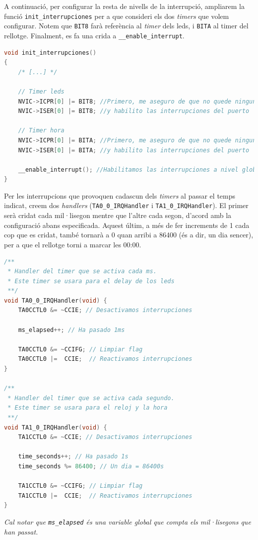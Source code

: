 \documentclass{../pdae} %
\begin{document}
A continuació, per configurar la resta de nivells de la interrupció, ampliarem
la funció \texttt{init\_interrupciones} per a que consideri els dos
\textit{timers} que volem configurar.
Notem que \texttt{BIT8} farà referència al \textit{timer} dels leds, i
\texttt{BITA} al timer del rellotge. Finalment, es fa una crida a
\texttt{\_\_enable\_interrupt}.

\begin{lstlisting}[language=C]
void init_interrupciones()
{
 	/* [...] */

    // Timer leds
    NVIC->ICPR[0] |= BIT8; //Primero, me aseguro de que no quede ninguna interrupcion residual pendiente para este puerto,
    NVIC->ISER[0] |= BIT8; //y habilito las interrupciones del puerto

    // Timer hora
    NVIC->ICPR[0] |= BITA; //Primero, me aseguro de que no quede ninguna interrupcion residual pendiente para este puerto,
    NVIC->ISER[0] |= BITA; //y habilito las interrupciones del puerto

    __enable_interrupt(); //Habilitamos las interrupciones a nivel global del micro.
}
\end{lstlisting}

Per les interrupcions que provoquen cadascun dels \textit{timers} al passar
el temps indicat, creem dos \textit{handlers} (\texttt{TA0\_0\_IRQHandler} i
\texttt{TA1\_0\_IRQHandler}). El primer serà cridat cada mil·lisegon mentre que
l'altre cada segon, d'acord amb la configuració abans especificada. Aquest
últim, a més de fer increments de 1 cada cop que es cridat, també tornarà a
0 quan arribi a 86400 (és a dir, un dia sencer), per a que el rellotge torni
a marcar les 00:00.

\begin{lstlisting}[language=C]
/**
 * Handler del timer que se activa cada ms.
 * Este timer se usara para el delay de los leds
 **/
void TA0_0_IRQHandler(void) {
    TA0CCTL0 &= ~CCIE; // Desactivamos interrupciones

    ms_elapsed++; // Ha pasado 1ms

    TA0CCTL0 &= ~CCIFG; // Limpiar flag
    TA0CCTL0 |=  CCIE;  // Reactivamos interrupciones
}

/**
 * Handler del timer que se activa cada segundo.
 * Este timer se usara para el reloj y la hora
 **/
void TA1_0_IRQHandler(void) {
    TA1CCTL0 &= ~CCIE; // Desactivamos interrupciones

    time_seconds++; // Ha pasado 1s
    time_seconds %= 86400; // Un dia = 86400s

    TA1CCTL0 &= ~CCIFG; // Limpiar flag
    TA1CCTL0 |=  CCIE;  // Reactivamos interrupciones
}
\end{lstlisting}
\textit{Cal notar que \texttt{ms\_elapsed} és una variable global que compta
els mil·lisegons que han passat.}
\end{document}
